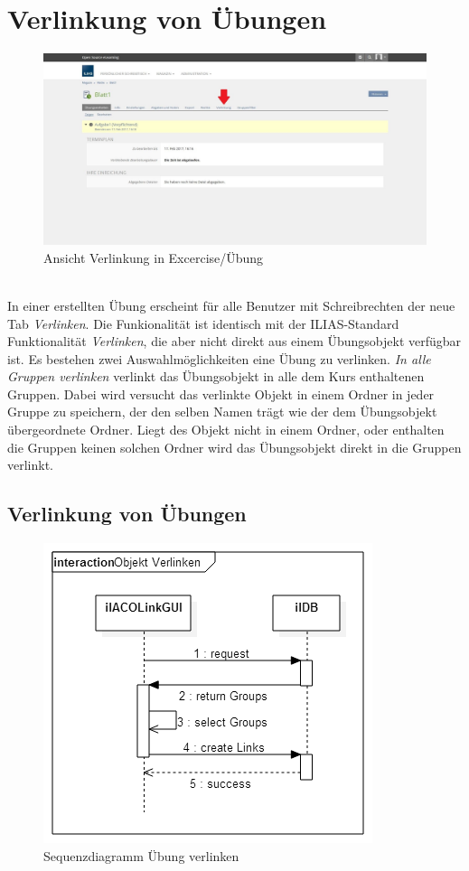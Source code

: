 \chapter{Verlinkung von Übungen}\label{linkUebung}
\begin{figure}[h!]
	\centering
	\includegraphics[width=1\textwidth]{img/excercise.jpg}
	\caption{Ansicht Verlinkung in Excercise/Übung}
\end{figure}

~\\In einer erstellten Übung erscheint für alle Benutzer mit Schreibrechten der neue Tab \textit{Verlinken}. Die Funkionalität ist identisch mit der ILIAS-Standard Funktionalität \textit{Verlinken}, die aber nicht direkt aus einem Übungsobjekt verfügbar ist. Es bestehen zwei Auswahlmöglichkeiten eine Übung zu verlinken. \textit{In alle Gruppen verlinken} verlinkt das Übungsobjekt in alle dem Kurs enthaltenen Gruppen. Dabei wird versucht das verlinkte Objekt in einem Ordner in jeder Gruppe zu speichern, der den selben Namen trägt wie der dem Übungsobjekt übergeordnete Ordner. Liegt des  Objekt nicht in einem Ordner, oder enthalten die Gruppen keinen solchen Ordner wird das Übungsobjekt direkt in die Gruppen verlinkt. 
\newpage

\section{Verlinkung von Übungen}
\begin{figure}[h!]
	\centering
	\includegraphics[width=.7\textwidth]{img/seq_linkGUI.png}
	\caption{Sequenzdiagramm Übung verlinken}
\end{figure}

